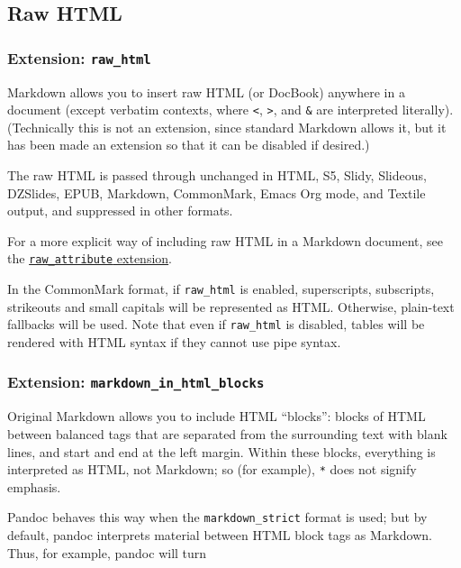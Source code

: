 \documentclass[
]{article}
\begin{document}
\hypertarget{raw-html}{%
\subsection{Raw HTML}\label{raw-html}}

\hypertarget{extension-raw_html}{%
\subsubsection{\texorpdfstring{Extension:
\texttt{raw\_html}}{Extension: raw\_html}}\label{extension-raw_html}}

Markdown allows you to insert raw HTML (or DocBook) anywhere in a
document (except verbatim contexts, where \texttt{\textless{}},
\texttt{\textgreater{}}, and \texttt{\&} are interpreted literally).
(Technically this is not an extension, since standard Markdown allows
it, but it has been made an extension so that it can be disabled if
desired.)

The raw HTML is passed through unchanged in HTML, S5, Slidy, Slideous,
DZSlides, EPUB, Markdown, CommonMark, Emacs Org mode, and Textile
output, and suppressed in other formats.

For a more explicit way of including raw HTML in a Markdown document,
see the
\protect\hyperlink{extension-raw_attribute}{\texttt{raw\_attribute}
extension}.

In the CommonMark format, if \texttt{raw\_html} is enabled,
superscripts, subscripts, strikeouts and small capitals will be
represented as HTML. Otherwise, plain-text fallbacks will be used. Note
that even if \texttt{raw\_html} is disabled, tables will be rendered
with HTML syntax if they cannot use pipe syntax.

\hypertarget{extension-markdown_in_html_blocks}{%
\subsubsection{\texorpdfstring{Extension:
\texttt{markdown\_in\_html\_blocks}}{Extension: markdown\_in\_html\_blocks}}\label{extension-markdown_in_html_blocks}}

Original Markdown allows you to include HTML ``blocks'': blocks of HTML
between balanced tags that are separated from the surrounding text with
blank lines, and start and end at the left margin. Within these blocks,
everything is interpreted as HTML, not Markdown; so (for example),
\texttt{*} does not signify emphasis.

Pandoc behaves this way when the \texttt{markdown\_strict} format is
used; but by default, pandoc interprets material between HTML block tags
as Markdown. Thus, for example, pandoc will turn
\end{document}
